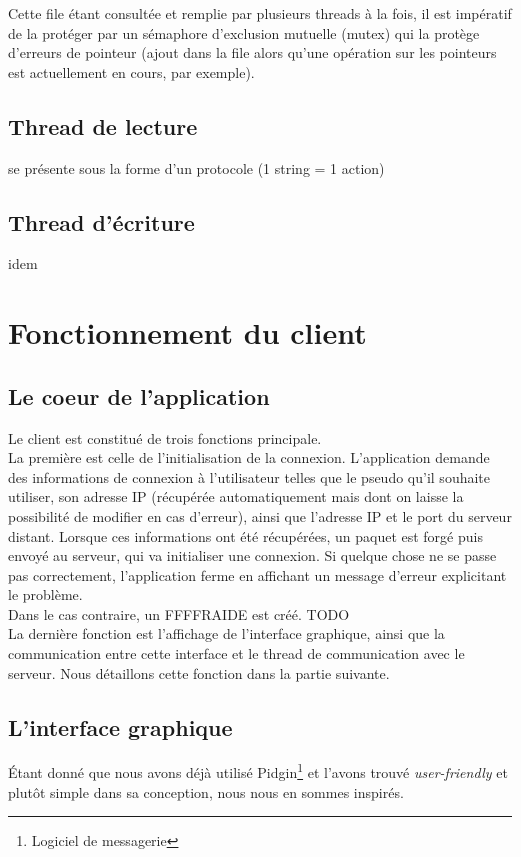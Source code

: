 			Cette file étant consultée et remplie par plusieurs threads à la fois, il est impératif de la protéger par un sémaphore d'exclusion mutuelle (mutex) qui la protège d'erreurs de pointeur (ajout dans la file alors qu'une opération sur les pointeurs est actuellement en cours, par exemple).
			
		\subsection{Thread de lecture}
			se présente sous la forme d'un protocole (1 string = 1 action)
			
		\subsection{Thread d'écriture}
			idem
			
	
	\section{Fonctionnement du client}
		\subsection{Le coeur de l'application}
			Le client est constitué de trois fonctions principale.\\
			
			La première est celle de l'initialisation de la connexion. L'application demande des informations de connexion à l'utilisateur telles que le pseudo qu'il souhaite utiliser, son adresse IP (récupérée automatiquement mais dont on laisse la possibilité de modifier en cas d'erreur), ainsi que l'adresse IP et le port du serveur distant. Lorsque ces informations ont été récupérées, un paquet est forgé puis envoyé au serveur, qui va initialiser une connexion. Si quelque chose ne se passe pas correctement, l'application ferme en affichant un message d'erreur explicitant le problème.\\
			
			Dans le cas contraire, un FFFFRAIDE est créé. {\Huge TODO}\\
			
			La dernière fonction est l'affichage de l'interface graphique, ainsi que la communication entre cette interface et le thread de communication avec le serveur. Nous détaillons cette fonction dans la partie suivante.
	
	
		\subsection{L'interface graphique}
			Étant donné que nous avons déjà utilisé Pidgin\footnote{Logiciel de messagerie} et l'avons trouvé \emph{user-friendly} et plutôt simple dans sa conception, nous nous en sommes inspirés.\\
			
